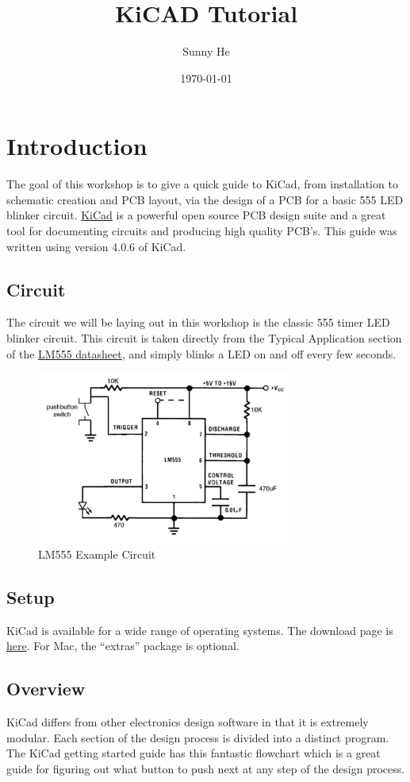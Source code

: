 \documentclass[12pt, oneside]{article}
\title{KiCAD Tutorial}
\date{\today}
\author{Sunny He}
\begin{document}
\maketitle
\section{Introduction}
The goal of this workshop is to give a quick guide to KiCad, from installation to schematic creation and PCB layout, via the design of a PCB for a basic 555 LED blinker circuit. \href{http://kicad-pcb.org/}{KiCad} is a powerful open source PCB design suite and a great tool for documenting circuits and producing high quality PCB's. This guide was written using version 4.0.6 of KiCad.

\subsection{Circuit}
The circuit we will be laying out in this workshop is the classic 555 timer LED blinker circuit. This circuit is taken directly from the Typical Application section of the \href{http://www.ti.com/lit/ds/symlink/lm555.pdf}{LM555 datasheet}, and simply blinks a LED on and off every few seconds.

\begin{figure}[H]
\includegraphics[width=0.75\textwidth]{DatasheetSchematic}
\centering
\caption{LM555 Example Circuit}
\end{figure}

\subsection{Setup}
KiCad is available for a wide range of operating systems. The download page is \href{http://kicad-pcb.org/download/}{here}. For Mac, the ``extras'' package is optional. 

\subsection{Overview}
KiCad differs from other electronics design software in that it is extremely modular. Each section of the design process is divided into a distinct program. The KiCad getting started guide has this fantastic flowchart which is a great guide for figuring out what button to push next at any step of the design process.
\end{document}
